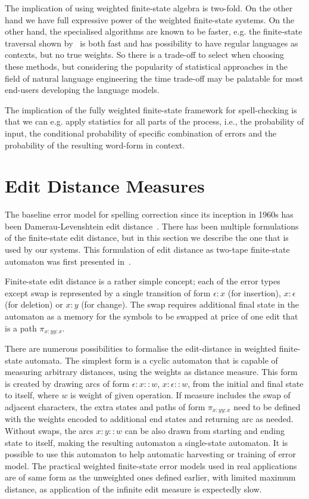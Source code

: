 \documentclass[officiallayout]{unihelcompling}
\begin{document}
The implication of using weighted finite-state algebra is two-fold. On the
other hand we have full expressive power of the weighted finite-state systems.
On the other hand, the specialised algorithms are known to be faster, e.g.  the
finite-state traversal shown by~\citet{hulden2009fast} is both fast and has
possibility to have regular languages as contexts, but no true weights. So
there is a trade-off to select when choosing these methods, but considering the
popularity of statistical approaches in the field of natural language
engineering the time trade-off may be palatable for most end-users developing
the language models.

The implication of the fully weighted finite-state framework for spell-checking
is that we can e.g. apply statistics for all parts of the process, i.e.,
the probability of input, the conditional probability of specific
combination of errors and the probability of the resulting word-form in 
context. 

\section{Edit Distance Measures}
\label{sec:edit-distance}

The baseline error model for spelling correction since its inception in 1960s
has been Damerau-Levenshtein edit
distance~\citep{damerau1964technique,levenshtein1966binary}. There has been
multiple formulations of the finite-state edit distance, but in this section
we describe the one that is used by our systems. This formulation of
edit distance as two-tape finite-state automaton was first presented 
in~\citet{schulz2002fast}.

Finite-state edit distance is a rather simple concept; each of the error types
except swap is represented by a single transition of form $\epsilon:x$ (for
insertion), $x:\epsilon$ (for deletion) or $x:y$ (for change). The swap
requires additional final state in the automaton as a memory for the symbols to
be swapped at price of one edit that is a path $\pi_{x:y y:x}$.

There are numerous possibilities to formalise the edit-distance in weighted
finite-state automata. The simplest form is a cyclic automaton that is
capable of measuring arbitrary distances, using the weights as distance 
measure. This form is created by drawing arcs of form $\epsilon:x::w$,
$x:\epsilon::w$, from the initial and final state to itself, 
where $w$ is weight of given operation. If measure includes the swap of 
adjacent characters, the extra states and paths of form $\pi_{x:y y:x}$ need to
be defined with the weights encoded to additional end states and returning arc
as needed. Without swaps, the arcs $x:y::w$ can be also drawn from starting
and ending state to itself, making the resulting automaton a single-state
automaton. It is possible to use this automaton to help automatic harvesting
or training of error model. The practical weighted finite-state error models
used in real applications are of same form as the unweighted ones defined
earlier, with limited maximum distance, as application of the infinite edit
measure is expectedly slow.
\end{document}
